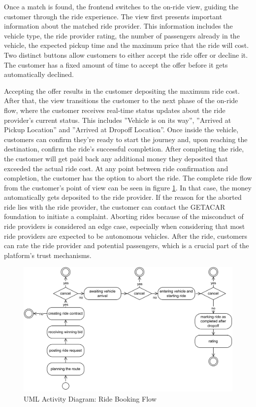 Once a match is found, the frontend switches to the on-ride view, guiding the customer through the ride experience. The view first presents important information about the matched ride provider. This information includes the vehicle type, the ride provider rating, the number of passengers already in the vehicle, the expected pickup time and the maximum price that the ride will cost. Two distinct buttons allow customers to either accept the ride offer or decline it. The customer has a fixed amount of time to accept the offer before it gets automatically declined. 

Accepting the offer results in the customer depositing the maximum ride cost. After that, the view  transitions the customer to the next phase of the on-ride flow, where the customer receives real-time status updates about the ride provider's current status. This includes ''Vehicle is on its way'', ''Arrived at Pickup Location'' and ''Arrived at Dropoff Location''. Once inside the vehicle, customers can confirm they're ready to start the journey and, upon reaching the destination, confirm the ride's successful completion. After completing the ride, the customer will get paid back any additional money they deposited that exceeded the actual ride cost. At any point between ride confirmation and completion, the customer has the option to abort the ride. The complete ride flow from the customer's point of view can be seen in figure \ref{fig:ridebookingflowUML}. In that case, the money automatically gets deposited to the ride provider. If the reason for the aborted ride lies with the ride provider, the customer can contact the GETACAR foundation to initiate a complaint. Aborting rides because of the misconduct of ride providers is considered an edge case, especially when considering that most ride providers are expected to be autonomous vehicles.  After the ride, customers can rate the ride provider and potential passengers, which is a crucial part of the platform's trust mechanisms.

\begin{figure}[h]
    \centering
    \includegraphics[width=\linewidth]{data/3.svg}
    \caption{UML Activity Diagram: Ride Booking Flow}
    \label{fig:ridebookingflowUML}
\end{figure}

